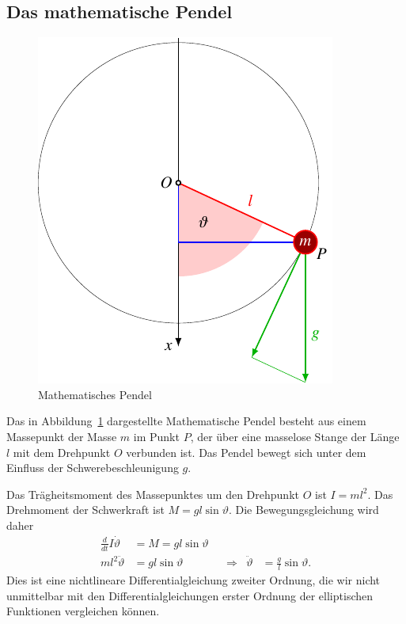 %
%
%

\subsection{Das mathematische Pendel
\label{buch:elliptisch:subsection:mathpendel}}
\begin{figure}
\centering
\includegraphics{chapters/110-elliptisch/images/pendel.pdf}
\caption{Mathematisches Pendel
\label{buch:elliptisch:fig:mathpendel}}
\end{figure}
Das in Abbildung~\ref{buch:elliptisch:fig:mathpendel} dargestellte
Mathematische Pendel besteht aus einem Massepunkt der Masse $m$
im Punkt $P$,
der über eine masselose Stange der Länge $l$ mit dem Drehpunkt $O$
verbunden ist.
Das Pendel bewegt sich unter dem Einfluss der Schwerebeschleunigung $g$.

Das Trägheitsmoment des Massepunktes um den Drehpunkt $O$ ist
\(
I=ml^2
\).
Das Drehmoment der Schwerkraft ist
\(M=gl\sin\vartheta\).
Die Bewegungsgleichung wird daher
\[
\begin{aligned}
\frac{d}{dt} I\dot{\vartheta}
&=
M
=
gl\sin\vartheta
\\
ml^2\ddot{\vartheta}
&=
gl\sin\vartheta
&&\Rightarrow&
\ddot{\vartheta}
&=\frac{g}{l}\sin\vartheta.
\end{aligned}
\]
Dies ist eine nichtlineare Differentialgleichung zweiter Ordnung, die
wir nicht unmittelbar mit den Differentialgleichungen erster Ordnung
der elliptischen Funktionen vergleichen können.


